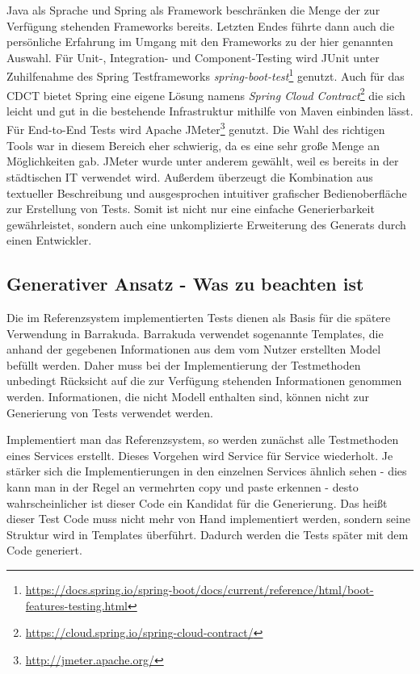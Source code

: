 \documentclass[12pt,a4paper,bibliography=totocnumbered,listof=totocnumbered]{scrartcl}
\begin{document}
Java als Sprache und Spring als Framework beschränken die Menge der zur Verfügung stehenden Frameworks bereits. Letzten Endes führte dann auch die persönliche Erfahrung im Umgang mit den Frameworks zu der hier genannten Auswahl. Für Unit-, Integration- und Component-Testing wird JUnit unter Zuhilfenahme des Spring Testframeworks \textit{spring-boot-test}\footnote{\url{https://docs.spring.io/spring-boot/docs/current/reference/html/boot-features-testing.html}} genutzt.
Auch für das \ac{CDCT} bietet Spring eine eigene Lösung namens \textit{Spring Cloud Contract}\footnote{\url{https://cloud.spring.io/spring-cloud-contract/}} die sich leicht und gut in die bestehende Infrastruktur mithilfe von Maven einbinden lässt.
Für End-to-End Tests wird Apache JMeter\footnote{\url{http://jmeter.apache.org/}} genutzt. Die Wahl des richtigen Tools war in diesem Bereich eher schwierig, da es eine sehr große Menge an Möglichkeiten gab. JMeter wurde unter anderem gewählt, weil es bereits in der städtischen IT verwendet wird. Außerdem überzeugt die Kombination aus textueller Beschreibung und ausgesprochen intuitiver grafischer Bedienoberfläche zur Erstellung von Tests. Somit ist nicht nur eine einfache Generierbarkeit gewährleistet, sondern auch eine unkomplizierte Erweiterung des Generats durch einen Entwickler.

\subsection{Generativer Ansatz - Was zu beachten ist}

Die im Referenzsystem implementierten Tests dienen als Basis für die spätere Verwendung in Barrakuda. Barrakuda verwendet sogenannte Templates, die anhand der gegebenen Informationen aus dem vom Nutzer erstellten Model befüllt werden. Daher muss bei der Implementierung der Testmethoden unbedingt Rücksicht auf die zur Verfügung stehenden Informationen genommen werden. Informationen, die nicht Modell enthalten sind, können nicht zur Generierung von Tests verwendet werden.

Implementiert man das Referenzsystem, so werden zunächst alle Testmethoden eines Services erstellt. Dieses Vorgehen wird Service für Service wiederholt. Je stärker sich die Implementierungen in den einzelnen Services ähnlich sehen - dies kann man in der Regel an vermehrten copy und paste erkennen - desto wahrscheinlicher ist dieser Code ein Kandidat für die Generierung. Das heißt dieser Test Code muss nicht mehr von Hand implementiert werden, sondern seine Struktur wird in Templates überführt. Dadurch werden die Tests später mit dem Code generiert.
\end{document}
